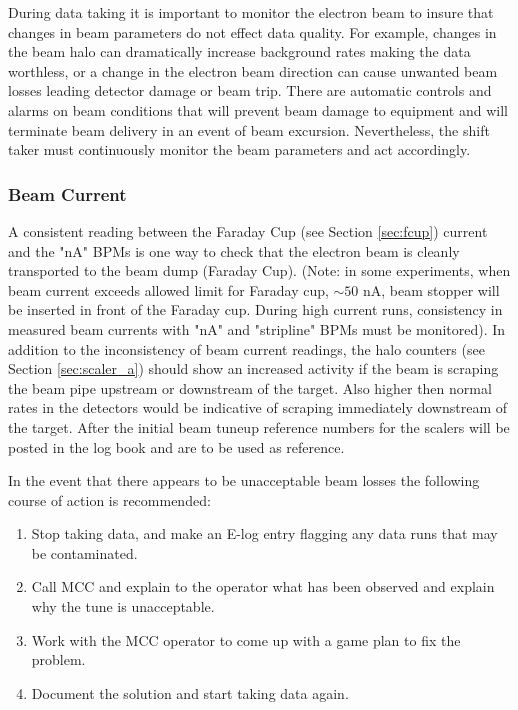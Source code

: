 \documentclass[12pt]{article}
\begin{document}
During data taking it is important to monitor the electron beam
to insure that changes in beam parameters do not effect data quality. For
example, changes in the beam halo can dramatically increase background rates
making the data worthless, or a change in the electron beam direction can cause
unwanted beam losses leading detector damage or beam trip. There are
automatic controls and alarms on beam conditions that will prevent beam damage to equipment 
and will terminate beam delivery in an event of beam excursion. Nevertheless,  the shift taker must
continuously monitor the beam parameters and act accordingly.

\subsubsection{Beam Current}

A consistent reading between the Faraday Cup (see Section \ref{sec:fcup}) current
and the "nA" BPMs is one way
to check that the electron beam is cleanly transported to the beam dump (Faraday Cup). (Note: in some experiments, when beam current exceeds allowed 
limit for Faraday cup, $\sim 50$ nA, beam stopper will be inserted in front of the Faraday cup. During high current runs, consistency in measured beam currents with "nA" and "stripline" BPMs must be monitored). In addition to the inconsistency of beam current readings, the halo counters (see Section \ref{sec:scaler_a}) should
show an increased activity if the beam is scraping the beam pipe upstream or downstream
of the target. Also higher then normal rates in the detectors would be indicative
of scraping immediately downstream of the target.
After the initial beam tuneup reference numbers for the scalers will be posted
in the log book and are to be used as reference. 

In the event that there appears to be unacceptable beam losses the following course of action is recommended:

\begin{enumerate}
\item Stop taking data, and make an E-log entry flagging any data runs that may be
contaminated.
\item Call MCC and explain to the operator what has been observed and explain why
the tune is unacceptable.
\item Work with the MCC operator to come up with a game plan to fix the problem.
\item Document the solution and start taking data again.
\end{enumerate}
\end{document}
